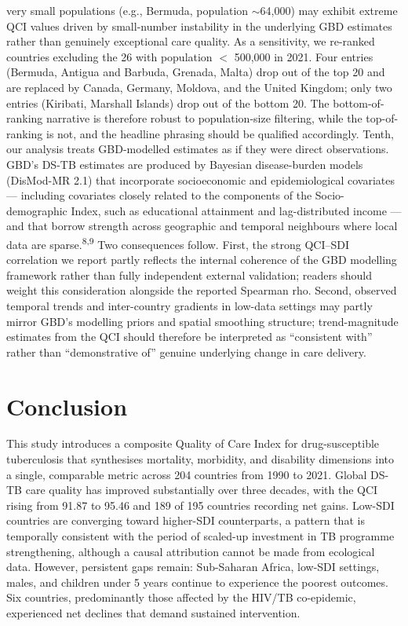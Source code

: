 \documentclass[12pt]{article}
\begin{document}
very small populations (e.g., Bermuda, population $\sim$64,000) may exhibit extreme QCI values driven by small-number instability in the underlying GBD estimates rather than genuinely exceptional care quality. As a sensitivity, we re-ranked countries excluding the 26 with population $<$ 500,000 in 2021. Four entries (Bermuda, Antigua and Barbuda, Grenada, Malta) drop out of the top 20 and are replaced by Canada, Germany, Moldova, and the United Kingdom; only two entries (Kiribati, Marshall Islands) drop out of the bottom 20. The bottom-of-ranking narrative is therefore robust to population-size filtering, while the top-of-ranking is not, and the headline phrasing should be qualified accordingly. Tenth, our analysis treats GBD-modelled estimates as if they were direct observations. GBD's DS-TB estimates are produced by Bayesian disease-burden models (DisMod-MR 2.1) that incorporate socioeconomic and epidemiological covariates --- including covariates closely related to the components of the Socio-demographic Index, such as educational attainment and lag-distributed income --- and that borrow strength across geographic and temporal neighbours where local data are sparse.\textsuperscript{8,9} Two consequences follow. First, the strong QCI--SDI correlation we report partly reflects the internal coherence of the GBD modelling framework rather than fully independent external validation; readers should weight this consideration alongside the reported Spearman rho. Second, observed temporal trends and inter-country gradients in low-data settings may partly mirror GBD's modelling priors and spatial smoothing structure; trend-magnitude estimates from the QCI should therefore be interpreted as ``consistent with'' rather than ``demonstrative of'' genuine underlying change in care delivery.


\section{Conclusion}

This study introduces a composite Quality of Care Index for drug-susceptible tuberculosis that synthesises mortality, morbidity, and disability dimensions into a single, comparable metric across 204 countries from 1990 to 2021. Global DS-TB care quality has improved substantially over three decades, with the QCI rising from 91.87 to 95.46 and 189 of 195 countries recording net gains. Low-SDI countries are converging toward higher-SDI counterparts, a pattern that is temporally consistent with the period of scaled-up investment in TB programme strengthening, although a causal attribution cannot be made from ecological data. However, persistent gaps remain: Sub-Saharan Africa, low-SDI settings, males, and children under 5 years continue to experience the poorest outcomes. Six countries, predominantly those affected by the HIV/TB co-epidemic, experienced net declines that demand sustained intervention.
\end{document}
